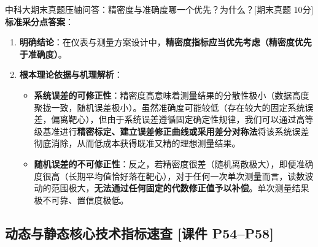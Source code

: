 \documentclass[11pt,a4paper]{ctexart}
\begin{document}
\begin{exambox}{中科大期末真题压轴问答：精密度与准确度哪一个优先？为什么？[期末真题 10分]}
\textbf{标准采分点答案}：
\begin{enumerate}
    \item \textbf{明确结论}：在仪表与测量方案设计中，\textbf{精密度指标应当优先考虑（精密度优先于准确度）}。
    \item \textbf{根本理论依据与机理解析}：
    \begin{itemize}
        \item \textbf{系统误差的可修正性}：精密度高意味着测量结果的分散性极小（数据高度聚拢一致，随机误差极小）。虽然准确度可能较低（存在较大的固定系统误差，偏离靶心），但由于系统误差遵循固定确定性规律，我们可以通过高等级基准进行\textbf{精密标定、建立误差修正曲线或采用差分对称法}将该系统误差彻底消除，从而低成本获得既准又精的理想测量结果。
        \item \textbf{随机误差的不可修正性}：反之，若精密度很差（随机离散极大），即便准确度很高（长期平均值恰好落在靶心），对于任何一次单次测量而言，读数波动的范围极大，\textbf{无法通过任何固定的代数修正值予以补偿}。单次测量结果极不可靠、置信度极低。
    \end{itemize}
\end{enumerate}
\end{exambox}

\subsection{动态与静态核心技术指标速查 \textnormal{[课件 P54--P58]}}
\end{document}
